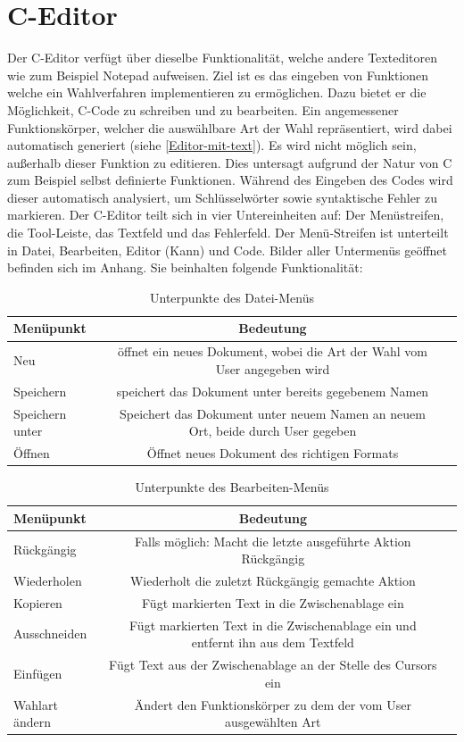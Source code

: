 \documentclass[a4paper]{scrreprt}
\begin{document}
\section{C-Editor}
Der C-Editor verfügt über dieselbe Funktionalität, welche andere Texteditoren wie zum Beispiel Notepad aufweisen. Ziel ist es das eingeben von Funktionen welche ein Wahlverfahren implementieren zu ermöglichen. Dazu bietet er die Möglichkeit, C-Code zu schreiben und zu bearbeiten. Ein angemessener Funktionskörper, welcher die auswählbare Art der Wahl repräsentiert, wird dabei automatisch generiert (siehe \ref{Editor-mit-text}). Es wird nicht möglich sein, außerhalb dieser Funktion zu editieren. Dies untersagt aufgrund der Natur von C zum Beispiel selbst definierte Funktionen. Während des Eingeben des Codes wird dieser automatisch analysiert, um Schlüsselwörter sowie syntaktische Fehler zu markieren. 
Der C-Editor teilt sich in vier Untereinheiten auf: Der Menüstreifen, die Tool-Leiste, das Textfeld und das Fehlerfeld. Der Menü-Streifen ist unterteilt in Datei, Bearbeiten, Editor (Kann) und Code. Bilder aller Untermenüs geöffnet befinden sich im Anhang. Sie beinhalten folgende Funktionalität:

\begin{table}[H]
\begin{tabular}{lcr} 
Menüpunkt & Bedeutung \\
\hline
Neu & öffnet ein neues Dokument, wobei die Art der Wahl vom User angegeben wird \\
Speichern & speichert das Dokument unter bereits gegebenem Namen \\
Speichern unter & Speichert das Dokument unter neuem Namen an neuem Ort, beide durch User gegeben \\
Öffnen & Öffnet neues Dokument des richtigen Formats
\end{tabular}
\label{Datei-Menüpunkte}
\caption{Unterpunkte des Datei-Menüs}
\end{table}

\begin{table}[H]
\begin{tabular}{lcr} 
Menüpunkt & Bedeutung \\
\hline
Rückgängig & Falls möglich: Macht die letzte ausgeführte Aktion Rückgängig \\
Wiederholen & Wiederholt die zuletzt Rückgängig gemachte Aktion \\
Kopieren & Fügt markierten Text in die Zwischenablage ein \\
Ausschneiden & Fügt markierten Text in die Zwischenablage ein und entfernt ihn aus dem Textfeld \\
Einfügen & Fügt Text aus der Zwischenablage an der Stelle des Cursors ein \\
Wahlart ändern & Ändert den Funktionskörper zu dem der vom User ausgewählten Art
\end{tabular}
\label{Bearbeiten-Menüpunkte}
\caption{Unterpunkte des Bearbeiten-Menüs}
\end{table}
\end{document}
